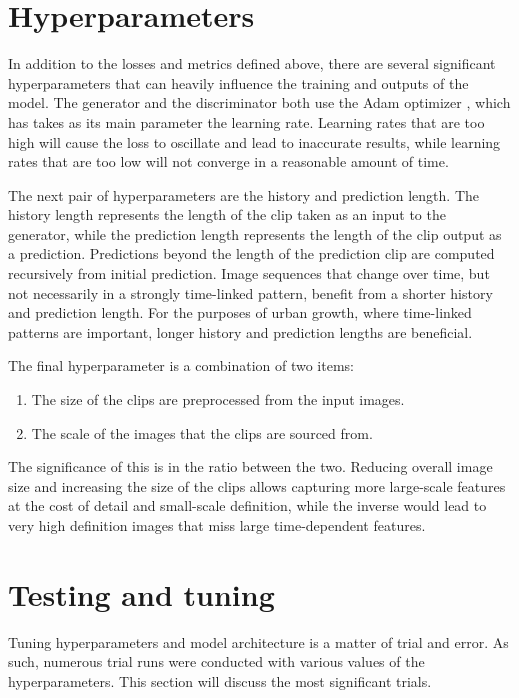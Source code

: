 \documentclass{article}
\begin{document}
\clearpage

\section{Hyperparameters}

In addition to the losses and metrics defined above, there are several significant hyperparameters that can heavily influence the training and outputs of the model. The generator and the discriminator both use the Adam optimizer \cite{adam}, which has takes as its main parameter the learning rate. Learning rates that are too high will cause the loss to oscillate and lead to inaccurate results, while learning rates that are too low will not converge in a reasonable amount of time.

The next pair of hyperparameters are the history and prediction length. The history length represents the length of the clip taken as an input to the generator, while the prediction length represents the length of the clip output as a prediction. Predictions beyond the length of the prediction clip are computed recursively from initial prediction. Image sequences that change over time, but not necessarily in a strongly time-linked pattern, benefit from a shorter history and prediction length. For the purposes of urban growth, where time-linked patterns are important, longer history and prediction lengths are beneficial.

The final hyperparameter is a combination of two items:
\begin{enumerate}[label=(\alph*)]
    \item The size of the clips are preprocessed from the input images.
    \item The scale of the images that the clips are sourced from.
\end{enumerate}

The significance of this is in the ratio between the two. Reducing overall image size and increasing the size of the clips allows capturing more large-scale features at the cost of detail and small-scale definition, while the inverse would lead to very high definition images that miss large time-dependent features.

\clearpage

\section{Testing and tuning}

Tuning hyperparameters and model architecture is a matter of trial and error. As such, numerous trial runs were conducted with various values of the hyperparameters. This section will discuss the most significant trials.
\end{document}
